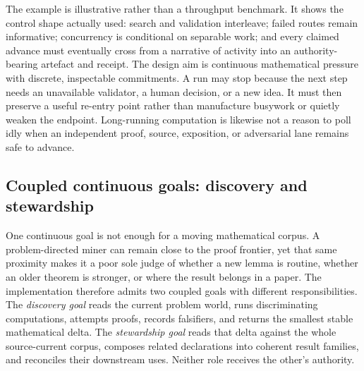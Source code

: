 \documentclass[10pt]{article}
\begin{document}
The example is illustrative rather than a throughput benchmark. It shows the
control shape actually used: search and validation interleave; failed routes
remain informative; concurrency is conditional on separable work; and every
claimed advance must eventually cross from a narrative of activity into an
authority-bearing artefact and receipt. The design aim is continuous
mathematical pressure with discrete, inspectable commitments. A run may stop
because the next step needs an unavailable validator, a human decision, or a
new idea. It must then preserve a useful re-entry point rather than manufacture
busywork or quietly weaken the endpoint. Long-running computation is likewise
not a reason to poll idly when an independent proof, source, exposition, or
adversarial lane remains safe to advance.

\subsection{Coupled continuous goals: discovery and stewardship}

One continuous goal is not enough for a moving mathematical corpus. A
problem-directed miner can remain close to the proof frontier, yet that same
proximity makes it a poor sole judge of whether a new lemma is routine,
whether an older theorem is stronger, or where the result belongs in a paper.
The implementation therefore admits two coupled goals with different
responsibilities. The \emph{discovery goal} reads the current problem world,
runs discriminating computations, attempts proofs, records falsifiers, and
returns the smallest stable mathematical delta. The \emph{stewardship goal}
reads that delta against the whole source-current corpus, composes related
declarations into coherent result families, and reconciles their downstream
uses. Neither role receives the other's authority.
\end{document}
